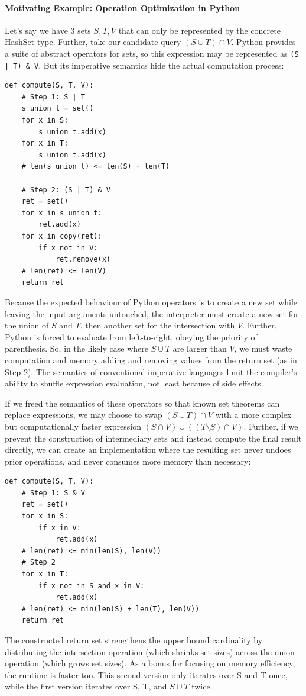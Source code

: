 \paragraph{Motivating Example: Operation Optimization in Python}
Let's say we have 3 sets $S, T, V$ that can only be represented by the concrete HashSet type. Further, take our candidate query $(S \cup T) \cap V$. Python provides a suite of abstract operators for sets, so this expression may be represented as \texttt{(S | T) \& V}. But its imperative semantics hide the actual computation process:
\begin{verbatim}
def compute(S, T, V):
    # Step 1: S | T
    s_union_t = set()
    for x in S:
        s_union_t.add(x)
    for x in T:
        s_union_t.add(x)
    # len(s_union_t) <= len(S) + len(T)

    # Step 2: (S | T) & V
    ret = set()
    for x in s_union_t:
        ret.add(x)
    for x in copy(ret):
        if x not in V:
            ret.remove(x)
    # len(ret) <= len(V)
    return ret
\end{verbatim}
Because the expected behaviour of Python operators is to create a new set while leaving the input arguments untouched, the interpreter must create a new set for the union of $S$ and $T$, then another set for the intersection with $V$. Further, Python is forced to evaluate from left-to-right, obeying the priority of parenthesis. So, in the likely case where $S \cup T$ are larger than $V$, we must waste computation and memory adding and removing values from the return set (as in Step 2). The semantics of conventional imperative languages limit the compiler's ability to shuffle expression evaluation, not least because of side effects.

If we freed the semantics of these operators so that known set theorems can replace expressions, we may choose to swap $(S \cup T) \cap V$ with a more complex but computationally faster expression $(S \cap V) \cup ((T \setminus S) \cap V)$. Further, if we prevent the construction of intermediary sets and instead compute the final result directly, we can create an implementation where the resulting set never undoes prior operations, and never consumes more memory than necessary:
\begin{verbatim}
def compute(S, T, V):
    # Step 1: S & V
    ret = set()
    for x in S:
        if x in V:
            ret.add(x)
    # len(ret) <= min(len(S), len(V))
    # Step 2
    for x in T:
        if x not in S and x in V:
            ret.add(x)
    # len(ret) <= min(len(S) + len(T), len(V))
    return ret
\end{verbatim}
The constructed return set strengthens the upper bound cardinality by distributing the intersection operation (which shrinks set sizes) across the union operation (which grows set sizes). As a bonus for focusing on memory efficiency, the runtime is faster too. This second version only iterates over S and T once, while the first version iterates over S, T, and $S \cup T$ twice.


